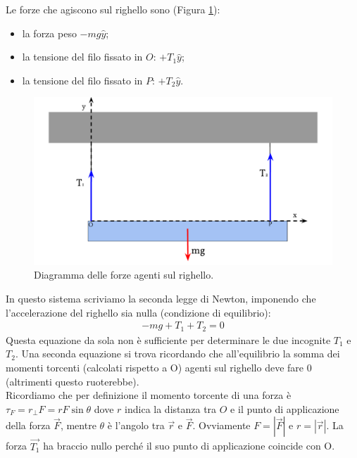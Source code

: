 \documentclass[12pt,a4paper]{book}
\begin{document}
Le forze che agiscono sul righello sono (Figura \ref{fig:righello2}):
\begin{itemize}
\item la forza peso $-mg\hat{y}$;
\item la tensione del filo fissato in $O$: $+T_1\hat{y}$;
\item la tensione del filo fissato in $P$:  $+T_2\hat{y}$.
\end{itemize}

\begin{figure}[!ht]
 \centering
\includegraphics[scale=0.45]{righello2.pdf}
\caption{Diagramma delle forze agenti sul righello. \label{fig:righello2} }
\end{figure}

In questo sistema scriviamo la seconda legge di Newton, imponendo che l'accelerazione del righello sia nulla (condizione di equilibrio):
\begin{gather*}
-mg+T_1+T_2=0
\end{gather*}
Questa equazione da sola non è sufficiente per determinare le due incognite $T_1$ e $T_2$. Una seconda equazione
si trova ricordando che all'equilibrio la somma dei momenti torcenti (calcolati rispetto a O) agenti sul righello deve fare 0 (altrimenti questo ruoterebbe).\\

 Ricordiamo che per definizione il momento torcente di una forza è $\tau_F=r_{\perp}F=rF\sin \theta$ dove $r$ indica la distanza tra $O$ e il punto di applicazione della forza $\vec{F}$, mentre $\theta$ è l'angolo tra $\vec{r}$ e $\vec{F}$. Ovviamente $F=|\vec{F}|$ e $r=|\vec{r}|$.
La forza $\vec{T_1}$ ha braccio nullo perché il suo punto di applicazione coincide con O.  \\
\end{document}
